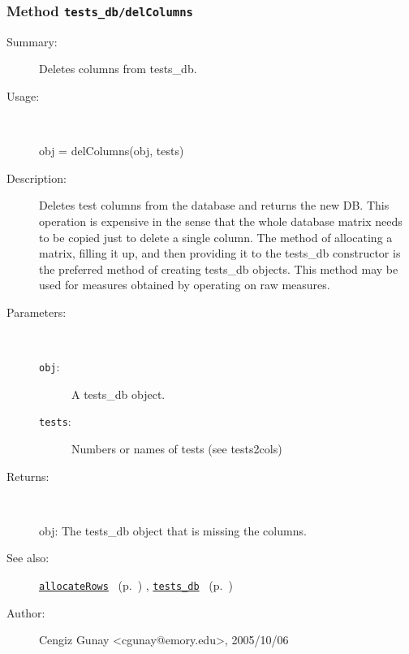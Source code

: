 \subsubsection[Method \texttt{delColumns}]{Method \texttt{tests\_db/delColumns}}%
%
\label{ref_tests_db__delColumns}%
\hypertarget{ref_tests_db__delColumns}{}%
\begin{description}
\item[Summary:]Deletes columns from tests\_db.
%
\item[Usage:]~%
\begin{lyxcode}%
obj = delColumns(obj, tests)
%
\end{lyxcode}%
%
\item[Description:]%
Deletes test columns from the database and returns the new DB.
   This operation is expensive in the sense that the whole database matrix
   needs to be copied just to delete a 
   single column. The method of allocating a matrix, filling it up, and
   then providing it to the tests\_db constructor is the preferred method 
   of creating tests\_db objects. This method may be used for 
   measures obtained by operating on raw measures.
\item[Parameters:]~
\begin{description}%
\item[\texttt{obj}:]
 A tests\_db object.
\item[\texttt{tests}:]
 Numbers or names of tests (see tests2cols)
\end{description}%
%
\item[Returns:]~

	obj: The tests\_db object that is missing the columns.
%
%
\item[See also:]%
\hyperlink{ref_allocateRows}{\texttt{allocateRows}}%
\ (p.~\pageref{ref_allocateRows})%
%
, \hyperlink{ref_tests_db}{\texttt{tests\_db}}%
\ (p.~\pageref{ref_tests_db})%
%
%
\item[Author:]%
Cengiz Gunay <cgunay@emory.edu>, 2005/10/06%
\end{description}
\methodline%

